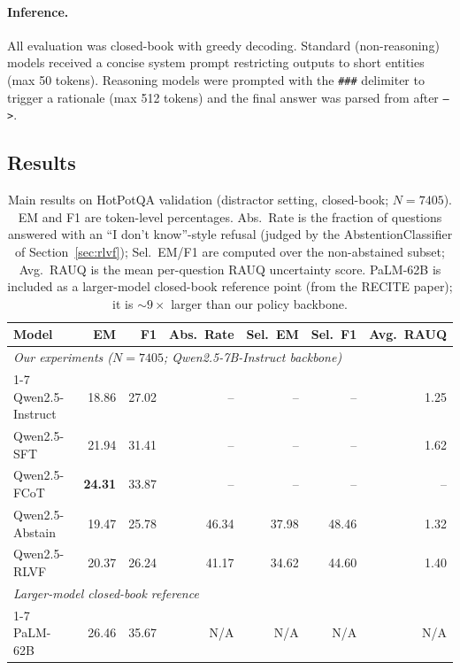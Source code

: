 \documentclass[11pt]{article}
\begin{document}
\paragraph{Inference.}
All evaluation was closed-book with greedy decoding. Standard (non-reasoning) models received a concise system prompt restricting outputs to short entities (max 50 tokens). Reasoning models were prompted with the \texttt{\#\#\#} delimiter to trigger a rationale (max 512 tokens) and the final answer was parsed from after \texttt{-->}.


\subsection{Results}

\begin{table}[t]
\centering
\small
\caption{Main results on HotPotQA validation (distractor setting, closed-book; $N=7405$). EM and F1 are token-level percentages. Abs.\ Rate is the fraction of questions answered with an ``I don't know''-style refusal (judged by the AbstentionClassifier of Section~\ref{sec:rlvf}); Sel.\ EM/F1 are computed over the non-abstained subset; Avg.\ RAUQ is the mean per-question RAUQ uncertainty score. PaLM-62B is included as a larger-model closed-book reference point (from the RECITE paper); it is $\sim 9\times$ larger than our policy backbone.}
\label{tab:hotpotqa_comparison}
\begin{tabular}{lrrrrrr}
\toprule
\textbf{Model} & \textbf{EM} & \textbf{F1} & \textbf{Abs.\ Rate} & \textbf{Sel.\ EM} & \textbf{Sel.\ F1} & \textbf{Avg.\ RAUQ} \\
\midrule
\multicolumn{7}{l}{\emph{Our experiments ($N=7405$; Qwen2.5-7B-Instruct backbone)}} \\
\cmidrule(lr){1-7}
Qwen2.5-Instruct  & 18.86 & 27.02 & --     & --    & --    & 1.25 \\
Qwen2.5-SFT       & 21.94 & 31.41 & --     & --    & --    & 1.62 \\
Qwen2.5-FCoT      & \textbf{24.31} & 33.87 & --     & --    & --    & --   \\
Qwen2.5-Abstain   & 19.47 & 25.78 & 46.34  & 37.98 & 48.46 & 1.32 \\
Qwen2.5-RLVF      & 20.37 & 26.24 & 41.17  & 34.62 & 44.60 & 1.40 \\
\midrule
\multicolumn{7}{l}{\emph{Larger-model closed-book reference}} \\
\cmidrule(lr){1-7}
PaLM-62B   & 26.46 & 35.67 & N/A & N/A & N/A & N/A \\
\bottomrule
\end{tabular}
\end{table}
\end{document}
